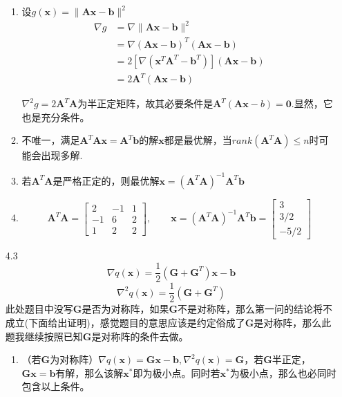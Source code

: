 \documentclass[UTF8]{ctexart}
\begin{document}
\begin{enumerate}
\begin{enumerate}
\item 设$g(\bm{x})=\|\bm{Ax}-\bm{b}\|^2$
\begin{align}
\nabla g&=\nabla \|\bm{Ax}-\bm{b}\|^2\\
&=\nabla (\bm{Ax}-\bm{b})^T(\bm{Ax}-\bm{b})\\
&=2[\nabla(\bm{x}^T\bm{A}^T-\bm{b}^T)](\bm{Ax}-\bm{b})\\
&=2\bm{A}^T(\bm{Ax}-\bm{b}) 
\end{align}

$\nabla^2 g=2\bm{A}^T\bm{A}$为半正定矩阵，故其必要条件是$\bm{A}^T(\bm{Ax}-b)=\bm{0}$.显然，它也是充分条件。

\item 不唯一，满足$\bm{A}^T\bm{Ax}=\bm{A}^T\bm{b}$的解$\bm{x}$都是最优解，当$rank(\bm{A}^T\bm{A})\leq n$时可能会出现多解.

\item 若$\bm{A}^T\bm{A}$是严格正定的，则最优解$\bm{x}=(\bm{A}^T\bm{A})^{-1}\bm{A}^T\bm{b}$

\item 
\[\bm{A}^T\bm{A}=\begin{bmatrix}
 2 & -1 & 1 \\
 -1 & 6 & 2 \\
 1 & 2 & 2 
\end{bmatrix},\qquad 
\bm{x}=(\bm{A}^T\bm{A})^{-1}\bm{A}^T\bm{b}=\begin{bmatrix}
3 \\
3/2 \\
-5/2
\end{bmatrix}\]
\end{enumerate}

\newpage
\item[4.3]
\[\nabla q(\bm{x})=\dfrac{1}{2}(\bm{G}+\bm{G}^T)\bm{x}-\bm{b}\]
\[\nabla^2 q(\bm{x})=\dfrac{1}{2}(\bm{G}+\bm{G}^T) \]
此处题目中没写$\bm{G}$是否为对称阵，如果$\bm{G}$不是对称阵，那么第一问的结论将不成立(下面给出证明)，感觉题目的意思应该是约定俗成了$\bm{G}$是对称阵，那么此题我继续按照已知$\bm{G}$是对称阵的条件去做。
\begin{enumerate}
\item （若$\bm{G}$为对称阵）$\nabla q(\bm{x})=\bm{G}\bm{x}-\bm{b},\nabla^2 q(\bm{x})=\bm{G}$，若$\bm{G}$半正定，$\bm{G}\bm{x}=\bm{b}$有解，那么该解$\bm{x}^{\ast}$即为极小点。同时若$\bm{x}^{\ast}$为极小点，那么也必同时包含以上条件。


\end{enumerate}
\end{enumerate}
\end{document}
